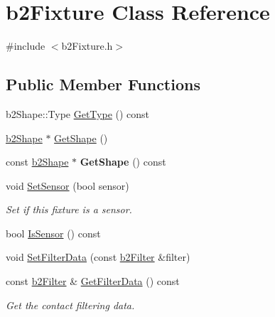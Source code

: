 \hypertarget{classb2_fixture}{}\section{b2\+Fixture Class Reference}
\label{classb2_fixture}


{\ttfamily \#include $<$b2\+Fixture.\+h$>$}

\subsection*{Public Member Functions}
\begin{DoxyCompactItemize}
\item 
b2\+Shape\+::\+Type \hyperlink{classb2_fixture_a7a566c1e3b768f6a72ebc3b758aad70e}{Get\+Type} () const
\item 
\hyperlink{classb2_shape}{b2\+Shape} $\ast$ \hyperlink{classb2_fixture_aaa2b73fa212fa53b1c800cccd7a1d31e}{Get\+Shape} ()
\item 
\mbox{\label{classb2_fixture_a783f8bcb19eee659686284872e70f383}} 
const \hyperlink{classb2_shape}{b2\+Shape} $\ast$ {\bfseries Get\+Shape} () const
\item 
\mbox{\label{classb2_fixture_a6198a81dcee0fe814d730383ebfa7038}} 
void \hyperlink{classb2_fixture_a6198a81dcee0fe814d730383ebfa7038}{Set\+Sensor} (bool sensor)
\begin{DoxyCompactList}\small\item\em Set if this fixture is a sensor. \end{DoxyCompactList}\item 
bool \hyperlink{classb2_fixture_aedd23d27ff7ce2d53b6c5b7a878a35d3}{Is\+Sensor} () const
\item 
void \hyperlink{classb2_fixture_a2c5e0d12c174927a4ad550459be334ad}{Set\+Filter\+Data} (const \hyperlink{structb2_filter}{b2\+Filter} \&filter)
\item 
\mbox{\label{classb2_fixture_ad956250d9f684a407992ec178320127e}} 
const \hyperlink{structb2_filter}{b2\+Filter} \& \hyperlink{classb2_fixture_ad956250d9f684a407992ec178320127e}{Get\+Filter\+Data} () const
\begin{DoxyCompactList}\small\item\em Get the contact filtering data. \end{DoxyCompactList}\item 

\end{DoxyCompactItemize}
